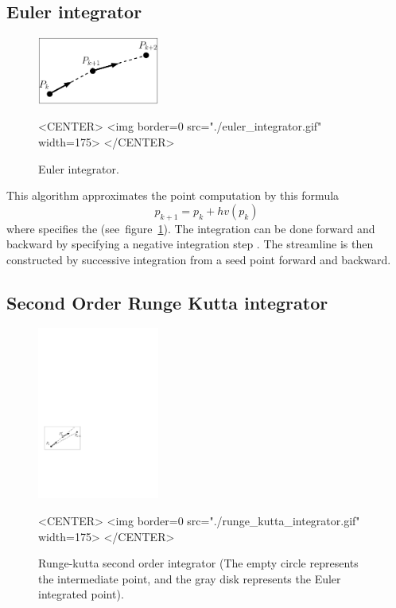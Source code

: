 \subsection{Euler integrator}

\begin{figure}[h!]
\begin{ccTexOnly}
\begin{center}
\includegraphics[width=4cm]{Stream_lines_2/euler_integrator}
\end{center}
\end{ccTexOnly}
\caption{Euler integrator.
\label{euler_fig}}
\begin{ccHtmlOnly}
<CENTER>
<img border=0 src="./euler_integrator.gif" width=175>
</CENTER>
\end{ccHtmlOnly}
\end{figure}

This algorithm approximates the point computation by this formula $$p_{k+1} = p_k + hv(p_k)$$ where  specifies the  (see~figure~\ref{euler_fig}). The integration can be done forward and backward by specifying a negative integration step . The streamline is then constructed by successive integration from a seed point forward and backward.

\subsection{Second Order Runge Kutta integrator}

\begin{figure}[h!]
\begin{ccTexOnly}
\begin{center}
\includegraphics[width=4cm]{Stream_lines_2/runge_kutta_integrator}
\end{center}
\end{ccTexOnly}
\caption{Runge-kutta second order integrator (The empty circle represents the intermediate point, and the gray disk represents the Euler integrated point).
\label{runge_kutta_fig}}
\begin{ccHtmlOnly}
<CENTER>
<img border=0 src="./runge_kutta_integrator.gif" width=175>
</CENTER>
\end{ccHtmlOnly}
\end{figure}

